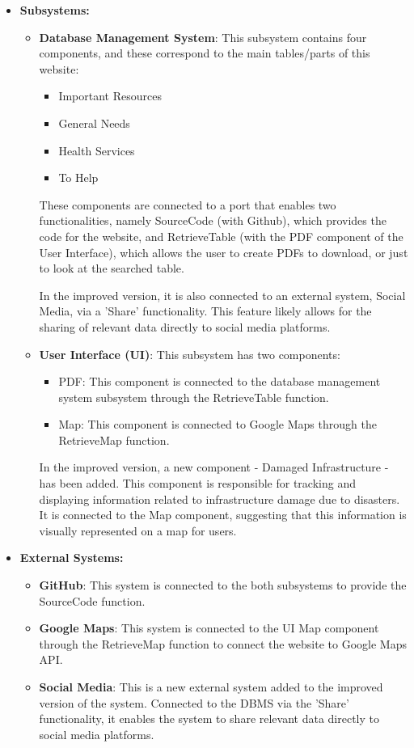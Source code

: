 \documentclass[12pt, letterpaper]{article}
\begin{document}
\begin{itemize}
    \item \textbf{Subsystems:}
    \begin{itemize}
        \item \textbf{Database Management System}: This subsystem contains four components, and these correspond to the main tables/parts of this website:
        \begin{itemize}
            \item Important Resources
            \item General Needs
            \item Health Services
            \item To Help
        \end{itemize}
        These components are connected to a port that enables two functionalities, namely SourceCode (with Github), which provides the code for the website, and RetrieveTable (with the PDF component of the User Interface), which allows the user to create PDFs to download, or just to look at the searched table.

        In the improved version, it is also connected to an external system, Social Media, via a 'Share' functionality. This feature likely allows for the sharing of relevant data directly to social media platforms.

        \item \textbf{User Interface (UI)}: This subsystem has two components:
        \begin{itemize}
            \item PDF: This component is connected to the database management system subsystem through the RetrieveTable function.
            \item Map: This component is connected to Google Maps through the RetrieveMap function.
        \end{itemize}
        In the improved version, a new component - Damaged Infrastructure - has been added. This component is responsible for tracking and displaying information related to infrastructure damage due to disasters. It is connected to the Map component, suggesting that this information is visually represented on a map for users.
    \end{itemize}

    \item \textbf{External Systems:}
    \begin{itemize}
        \item \textbf{GitHub}: This system is connected to the both subsystems to provide the SourceCode function.
        \item \textbf{Google Maps}: This system is connected to the UI Map component through the RetrieveMap function to connect the website to Google Maps API.
        \item \textbf{Social Media}: This is a new external system added to the improved version of the system. Connected to the DBMS via the 'Share' functionality, it enables the system to share relevant data directly to social media platforms.
    \end{itemize}
\end{itemize}
\end{document}

